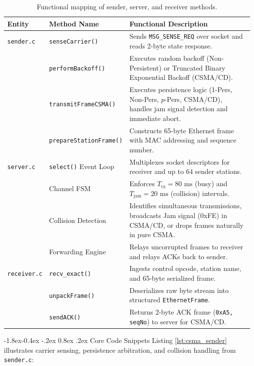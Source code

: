 \documentclass[11pt,a4paper]{article}
\makeatletter
\renewcommand\subsection{\@startsection{subsection}{2}{\z@}%
                                     {-1.8ex\@plus -0.4ex \@minus -.2ex}%
                                     {0.8ex \@plus .2ex}%
                                     {\normalfont\large\bfseries}}
\makeatother
\begin{document}
\begin{table}[H]
    \centering
    \footnotesize
    \renewcommand{\arraystretch}{1.04}
    \begin{tabularx}{\textwidth}{llX}
        \toprule
        \textbf{Entity} & \textbf{Method Name} & \textbf{Functional Description} \\
        \midrule
        \texttt{sender.c} 
        & \texttt{senseCarrier()} & Sends \texttt{MSG\_SENSE\_REQ} over socket and reads 2-byte state response. \\
        & \texttt{performBackoff()} & Executes random backoff (Non-Persistent) or Truncated Binary Exponential Backoff (CSMA/CD). \\
        & \texttt{transmitFrameCSMA()} & Executes persistence logic (1-Pers, Non-Pers, $p$-Pers, CSMA/CD), handles jam signal detection and immediate abort. \\
        & \texttt{prepareStationFrame()} & Constructs 65-byte Ethernet frame with MAC addressing and sequence number. \\
        \midrule
        \texttt{server.c} 
        & \texttt{select()} Event Loop & Multiplexes socket descriptors for receiver and up to 64 sender stations. \\
        & Channel FSM & Enforces $T_{\text{tx}} = 80\text{ ms}$ (busy) and $T_{\text{jam}} = 20\text{ ms}$ (collision) intervals. \\
        & Collision Detection & Identifies simultaneous transmissions, broadcasts Jam signal (0xFE) in CSMA/CD, or drops frames naturally in pure CSMA. \\
        & Forwarding Engine & Relays uncorrupted frames to receiver and relays ACKs back to sender. \\
        \midrule
        \texttt{receiver.c} 
        & \texttt{recv\_exact()} & Ingests control opcode, station name, and 65-byte serialized frame. \\
        & \texttt{unpackFrame()} & Deserializes raw byte stream into structured \texttt{EthernetFrame}. \\
        & \texttt{sendACK()} & Returns 2-byte ACK frame (\texttt{0xA5, seqNo}) to server for CSMA/CD. \\
        \bottomrule
    \end{tabularx}
    \caption{Functional mapping of sender, server, and receiver methods.}
    \label{tab:methods}
\end{table}

\subsection{Core Code Snippets}
Listing \ref{lst:csma_sender} illustrates carrier sensing, persistence arbitration, and collision handling from \texttt{sender.c}:
\end{document}
